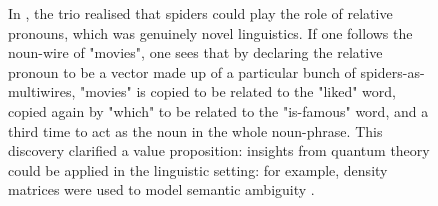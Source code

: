 \begin{figure}[h!]
\centering
{}
\caption{In \citep{sadrzadeh_frobenius_2013,sadrzadeh_frobenius_2016}, the trio realised that spiders could play the role of relative pronouns, which was genuinely novel linguistics. If one follows the noun-wire of "movies", one sees that by declaring the relative pronoun to be a vector made up of a particular bunch of spiders-as-multiwires, "movies" is copied to be related to the "liked" word, copied again by "which" to be related to the "is-famous" word, and a third time to act as the noun in the whole noun-phrase. This discovery clarified a value proposition: insights from quantum theory could be applied in the linguistic setting: for example, density matrices were used to model semantic ambiguity \citep{meyer_modelling_2020}.}
\end{figure}

